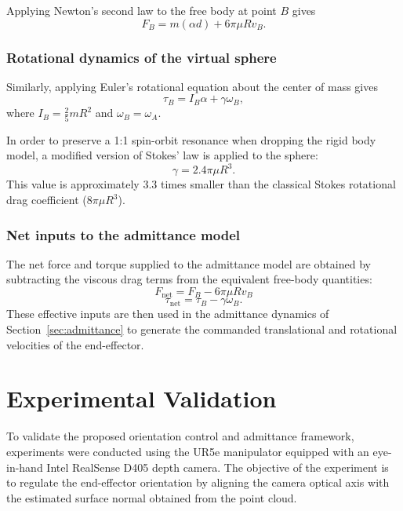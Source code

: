 \documentclass[journal]{IEEEtran}
\begin{document}
Applying Newton's second law to the free body at point $B$ gives
%
\begin{equation}
F_B = m(\alpha d) + 6\pi \mu R v_B.
\end{equation}
%
\subsubsection{Rotational dynamics of the virtual sphere}

Similarly, applying Euler's rotational equation about the center of mass gives
%
\begin{equation}
\tau_B = I_B \alpha + \gamma \omega_B,
\end{equation}
%
where $I_B = \frac{2}{5}mR^2$ and $\omega_B = \omega_A$.

In order to preserve a 1:1 spin-orbit resonance when dropping the rigid body model, a modified version of Stokes' law is applied to the sphere:
%
\begin{equation}
\gamma = 2.4\pi \mu R^3.
\end{equation}
%
This value is approximately $3.3$ times smaller than the classical Stokes rotational drag coefficient ($8\pi\mu R^3$).



\subsubsection{Net inputs to the admittance model}

The net force and torque supplied to the admittance model are obtained by subtracting the viscous drag terms from the equivalent free-body quantities:
%
\begin{equation}
F_{\mathrm{net}} = F_B - 6\pi \mu R v_B
\end{equation}
%
\begin{equation}
\tau_{\mathrm{net}} = \tau_B - \gamma \omega_B.
\end{equation}
%
These effective inputs are then used in the admittance dynamics of Section~\ref{sec:admittance} to generate the commanded translational and rotational velocities of the end-effector.

\section{Experimental Validation}
\label{sec:experiments}

To validate the proposed orientation control and admittance framework, experiments were conducted using the UR5e manipulator equipped with an eye-in-hand Intel RealSense D405 depth camera. The objective of the experiment is to regulate the end-effector orientation by aligning the camera optical axis with the estimated surface normal obtained from the point cloud.
\end{document}
